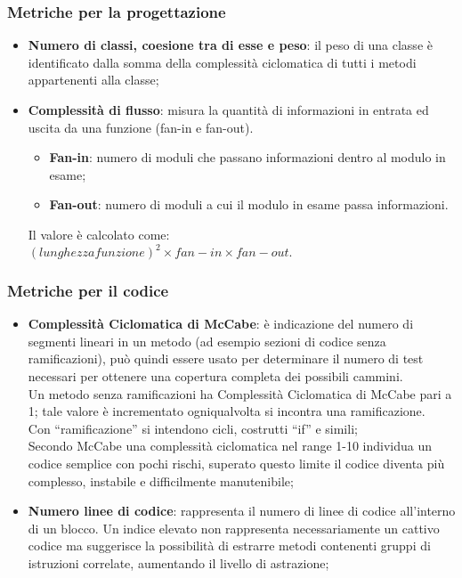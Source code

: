 \subsubsection{Metriche per la progettazione}{
	\begin{itemize}
		\item \textbf{Numero di classi, coesione tra di esse e peso}: il peso di una classe è identificato dalla somma della complessità ciclomatica di tutti i metodi appartenenti alla classe;
	 	\item \textbf{Complessità di flusso}: misura la quantità di informazioni in	entrata ed uscita da una funzione (fan-in e fan-out).\\
	 	\begin{itemize}
	 	 \item \textbf{Fan-in}: numero di moduli che passano informazioni dentro al modulo in esame;
	 	 \item \textbf{Fan-out}: numero di moduli a cui il modulo in esame passa informazioni.
	 	\end{itemize}
	 	Il valore è calcolato come:\\
	 	$(lunghezzafunzione)^2\times fan-in \times fan-out.$
	\end{itemize}
\subsubsection{Metriche per il codice}{
	\begin{itemize}
		\item \textbf{Complessità Ciclomatica di McCabe}: è indicazione del numero di segmenti lineari in un metodo (ad esempio sezioni di codice senza ramificazioni), può quindi essere usato per determinare il numero di test necessari per ottenere una copertura completa dei possibili cammini.  \\
		Un metodo senza ramificazioni ha Complessità Ciclomatica di McCabe pari a 1; tale valore è incrementato ogniqualvolta si incontra una ramificazione.  \\
		Con “ramificazione” si intendono cicli, costrutti “if” e simili;\\
		Secondo McCabe una complessità ciclomatica nel range 1-10 individua un codice semplice con pochi rischi, superato questo limite il codice diventa più complesso, instabile e difficilmente manutenibile;
		
		\item \textbf{Numero linee di codice}: rappresenta il numero di linee di codice all'interno di un blocco. 
		Un indice elevato non rappresenta necessariamente un cattivo codice ma suggerisce la possibilità di estrarre metodi contenenti gruppi di istruzioni correlate, aumentando il livello di astrazione;
		

\end{itemize}}}
